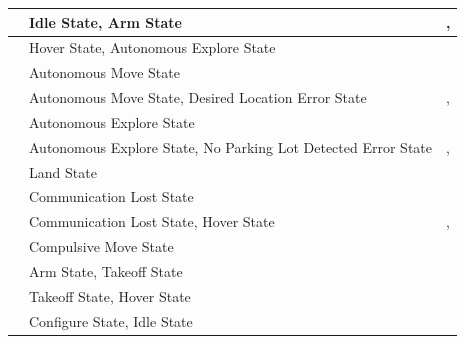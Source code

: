 \documentclass[12pt, titlepage]{article}
\begin{document}
\begin{table}[!h]
\begin{center}
\begin{tabular}{ | m{2.5cm} | m{7.5cm} | m{7.5cm} | }
\nameref{TRANS_003} & Idle State, Arm State & \nameref{NonFlightStates}, \nameref{FlightStates} \\ \hline
\nameref{TRANS_004} & Hover State, Autonomous Explore State & \nameref{FlightStates} \\ \hline
\nameref{TRANS_005} & Autonomous Move State & \nameref{FlightStates} \\ \hline
\nameref{TRANS_006} & Autonomous Move State, Desired Location Error State & \nameref{FlightStates}, \nameref{ErrorStates} \\ \hline
\nameref{TRANS_007} & Autonomous Explore State & \nameref{FlightStates} \\ \hline
\nameref{TRANS_008} & Autonomous Explore State, No Parking Lot Detected Error State & \nameref{FlightStates}, \nameref{ErrorStates} \\ \hline
\nameref{TRANS_009} & Land State & \nameref{FlightStates} \\ \hline
\nameref{TRANS_010} & Communication Lost State & \nameref{ErrorStates} \\ \hline
\nameref{TRANS_011} & Communication Lost State, Hover State & \nameref{ErrorStates}, \nameref{FlightStates} \\ \hline
\nameref{TRANS_012} & Compulsive Move State & \nameref{FlightStates} \\ \hline
\nameref{TRANS_013} & Arm State, Takeoff State & \nameref{FlightStates} \\ \hline
\nameref{TRANS_014} & Takeoff State, Hover State & \nameref{FlightStates} \\ \hline
\nameref{TRANS_015} & Configure State, Idle State & \nameref{NonFlightStates} \\ \hline
\end{tabular}
\end{center}
\end{table}
\end{document}
